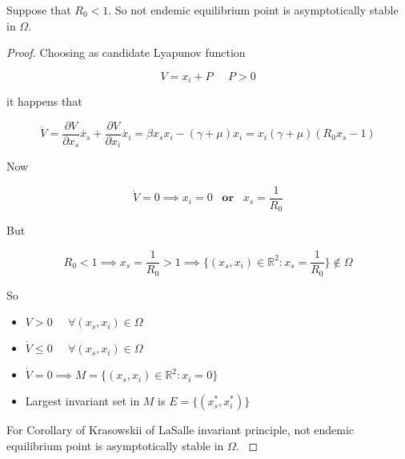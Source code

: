 \begin{theorem}
Suppose that $R_0 < 1$. So not endemic equilibrium point is asymptotically stable in $\Omega$.
\end{theorem}

\begin{proof}
Choosing as candidate Lyapunov function

\begin{equation}
    \label{eq:lyapunov_r0_minor_1}
    V = x_i + P \;\;\;\;\; P > 0
\end{equation}

it happens that

\begin{equation}
    \label{eq:lyapunov_derivative_1_r0_minor_1}
    \dot{V} = \frac{\partial V}{\partial x_s} \dot{x_s} + \frac{\partial V}{\partial x_i} \dot{x_i} = \beta x_sx_i-\left(\gamma+\mu\right)x_i=x_i\left(\gamma+\mu\right)\left(R_0x_s-1\right)
\end{equation}

Now

\begin{equation}
    \dot{V} = 0 \implies x_i = 0 \;\;\;\textbf{or}\;\;\; x_s = \frac{1}{R_0}
\end{equation}

But

\begin{equation}
    R_0 < 1 \implies x_s = \frac{1}{R_0} > 1 \implies \{(x_s,x_i) \in \mathbb{R}^2: x_s = \frac{1}{R_0}\} \notin \Omega
\end{equation}

So

\begin{itemize}
    \item $V > 0 \;\;\;\;\; \forall \left( x_s, x_i \right) \in \Omega$
    \item $ \dot{V} \leq 0 \;\;\;\;\; \forall \left( x_s, x_i \right) \in \Omega$
    \item $ \dot{V} = 0 \implies M = \{(x_s,x_i) \in \mathbb{R}^2: x_i = 0\}$
    \item Largest invariant set in $M$ is $E = \{(x_s^*,x_i^*)\}$
\end{itemize}

For Corollary of Krasowskii of LaSalle invariant principle, not endemic equilibrium point is asymptotically stable in $\Omega$. \cite[p.128]{bib:khalil}
\end{proof}